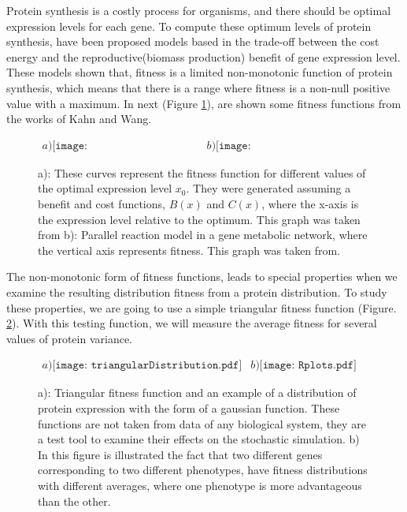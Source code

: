 Protein synthesis is a costly process for organisms, and there should be optimal expression levels for each gene. To compute these optimum levels of protein synthesis, have been proposed  models based in the trade-off between the cost energy and the reproductive(biomass production) benefit of gene expression level\cite{Kahn2010, Wang2011}. These models  shown that, fitness is a limited non-monotonic function of protein synthesis, which means that there is a range where fitness is a non-null positive value with a maximum. In next  (Figure \ref{Fig7.1}), are shown some fitness functions from the works of Kahn and Wang.
\begin{figure}[H]
\begin{center}$
\begin{array}{cc}
a)\texttt{[image: FitnesVsexpression1.png]} &
b)\texttt{[image: FitnessVsExpression2.png]}
\end{array}$
\end{center}
\caption{a): These curves represent the fitness function for different values of the optimal expression level $x_{0}$. They were generated assuming a benefit and cost functions, $B(x)$ and $C(x)$, where the x-axis is the expression level relative to the optimum. This graph was taken from \cite{Kahn2010}  b): Parallel reaction model in a gene metabolic network, where the vertical axis represents fitness. This graph was taken from\cite{Wang2011}.}
\label{Fig7.1}
\end{figure}

The non-monotonic form of fitness functions, leads to special properties when we examine the resulting distribution fitness from a protein distribution. To study these properties, we are going to use a simple triangular fitness function (Figure. \ref{Fig7.2}). With this testing function, we will measure the average fitness for several values of protein  variance.
\begin{figure}[H]
\begin{center}$
\begin{array}{cc}
a)\texttt{[image: triangularDistribution.pdf]} &
b)\texttt{[image: Rplots.pdf]}
\end{array}$
\end{center}
\caption{a): Triangular fitness function and an example of a distribution of protein expression with the form of a gaussian function. These functions are not taken from data of any biological system, they are a test tool to examine their effects on the stochastic simulation. b) In this figure is illustrated the fact that two different genes corresponding to two different phenotypes, have fitness distributions with different averages, where one phenotype is more advantageous than the other.}
\label{Fig7.2}
\end{figure}

